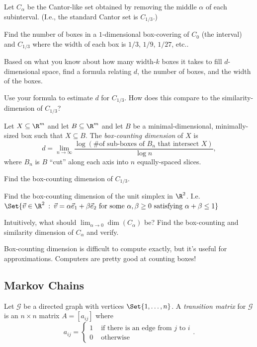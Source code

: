 	\question
	Let $C_\alpha$ be the Cantor-like set obtained by removing the middle $\alpha$ of each subinterval.
	(I.e., the standard Cantor set is $C_{1/3}$.)
	\begin{parts}
		\item Find the number of boxes in a $1$-dimensional box-covering of $C_{0}$ 
			(the interval) and  $C_{1/3}$ where the width of each box is $1/3$, $1/9$, $1/27$, etc..
		\item Based on what you know about how many width-$k$ boxes it takes to fill $d$-dimensional space,
			find a formula relating $d$, the number of boxes, and the width of the boxes.
		\item Use your formula to estimate $d$ for $C_{1/3}$. How does this compare to the similarity-dimension
			of $C_{1/3}$?
	\end{parts}

	\begin{definition}
		Let $X\subseteq \R^m$ and let $B\subseteq \R^m$ and let $B$ be a minimal-dimensional, minimally-sized box such
		that $X\subseteq B$. The \emph{box-counting dimension} of $X$ is
		\[
			d=\lim_{n\to\infty} \frac{\log(\text{\# of sub-boxes of $B_n$ that intersect $X$})}{\log n},
		\]
		where $B_n$ is $B$ ``cut'' along each axis into $n$ equally-spaced slices.
	\end{definition}

	\begin{parts}[resume]
		\item Find the box-counting dimension of $C_{1/3}$.
		\item Find the box-counting dimension of the unit simplex in $\R^2$. I.e. $\Set{\vec v\in \R^2\given \vec v=
			\alpha\xhat+\beta \yhat\text{ for some }\alpha,\beta\geq 0\text{ satisfying }\alpha+\beta \leq 1
			}$
		\item Intuitively, what should $\lim_{\alpha\to 0} \dim(C_\alpha)$ be? Find the box-counting and similarity
			dimension of $C_\alpha$ and verify.
	\end{parts}
	
	Box-counting dimension is difficult to compute exactly, but it's useful for approximations. Computers are
	pretty good at counting boxes!

	\newpage
	\subsection*{Markov Chains}
	
	\begin{definition}
		Let $\mathcal G$ be a directed graph with vertices $\Set{1,\ldots, n}$.
		A \emph{transition matrix} for $\mathcal G$ is an $n\times n$ matrix $A=[a_{ij}]$ where
		\[
			a_{ij} = \begin{cases}
				1 &\text{ if there is an edge from $j$ to $i$}\\
				0 &\text{ otherwise}
			\end{cases}.
		\]
	\end{definition}

